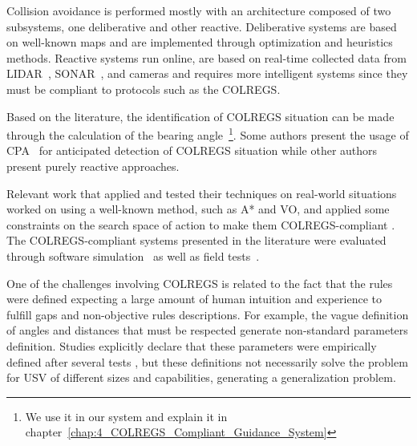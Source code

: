    Collision avoidance is performed mostly with an architecture composed of two subsystems, one deliberative and other reactive. Deliberative systems are based on well-known maps and are implemented through optimization and heuristics methods. Reactive systems run online, are based on real-time collected data from \ac{LIDAR}~\cite{Agrawal2015COLREGS}, \ac{SONAR}~\cite{Candeloro2017Voronoi}, and cameras\cite{Kuwata2014Safe} and requires more intelligent systems since they must be compliant to protocols such as the \ac{COLREGS}. 
    
    Based on the literature, the identification of \ac{COLREGS} situation can be made through the calculation of the bearing angle~\cite{Kuwata2014Safe}\footnote{We use it in our system and explain it in chapter~\ref{chap:4_COLREGS_Compliant_Guidance_System}}. Some authors present the usage of \ac{CPA}~\cite{Campbell2013Automatic} for anticipated detection of \ac{COLREGS} situation while other authors present purely reactive approaches.
    
    Relevant work that applied and tested their techniques on real-world situations worked on using a well-known method, such as A* and \ac{VO}, and applied some constraints on the search space of action to make them \ac{COLREGS}-compliant \cite{Kuwata2014Safe, Campbell2013Automatic}. 
    The \ac{COLREGS}-compliant systems presented in the literature were evaluated through software simulation~\cite{Soltan2009Trajectory, Abdelaal2017NMPC, Benjamin2004COLREGS, Lee2004Fuzzy} as well as field tests~\cite{Agrawal2015COLREGS, Benjamin2004COLREGS, Kuwata2014Safe}.
    
    One of the challenges involving \ac{COLREGS} is related to the fact that the rules were defined expecting a large amount of human intuition and experience to fulfill gaps and non-objective rules descriptions. For example, the vague definition of angles and distances that must be respected generate non-standard parameters definition. Studies explicitly declare that these parameters were empirically defined after several tests \cite{Larson2007Advances}, but these definitions not necessarily solve the problem for \ac{USV} of different sizes and capabilities, generating a generalization problem.
    
    
    
    
    
    
